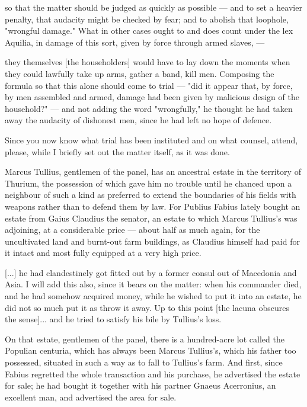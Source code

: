  so that the matter should be judged as quickly as possible --- and to set a heavier penalty, that audacity might be checked by fear; and to abolish that loophole, "wrongful damage." What in other cases ought to and does count under the lex Aquilia, in damage of this sort, given by force through armed slaves, ---

 they themselves [the householders] would have to lay down the moments when they could lawfully take up arms, gather a band, kill men. Composing the formula so that this alone should come to trial --- "did it appear that, by force, by men assembled and armed, damage had been given by malicious design of the household?" --- and not adding the word "wrongfully," he thought he had taken away the audacity of dishonest men, since he had left no hope of defence.

 Since you now know what trial has been instituted and on what counsel, attend, please, while I briefly set out the matter itself, as it was done.

 Marcus Tullius, gentlemen of the panel, has an ancestral estate in the territory of Thurium, the possession of which gave him no trouble until he chanced upon a neighbour of such a kind as preferred to extend the boundaries of his fields with weapons rather than to defend them by law. For Publius Fabius lately bought an estate from Gaius Claudius the senator, an estate to which Marcus Tullius's was adjoining, at a considerable price --- about half as much again, for the uncultivated land and burnt-out farm buildings, as Claudius himself had paid for it intact and most fully equipped at a very high price.

 [...] he had clandestinely got fitted out by a former consul out of Macedonia and Asia. I will add this also, since it bears on the matter: when his commander died, and he had somehow acquired money, while he wished to put it into an estate, he did not so much put it as throw it away. Up to this point [the lacuna obscures the sense]... and he tried to satisfy his bile by Tullius's loss.

 On that estate, gentlemen of the panel, there is a hundred-acre lot called the Populian centuria, which has always been Marcus Tullius's, which his father too possessed, situated in such a way as to fall to Tullius's farm. And first, since Fabius regretted the whole transaction and his purchase, he advertised the estate for sale; he had bought it together with his partner Gnaeus Acerronius, an excellent man, and advertised the area for sale.


